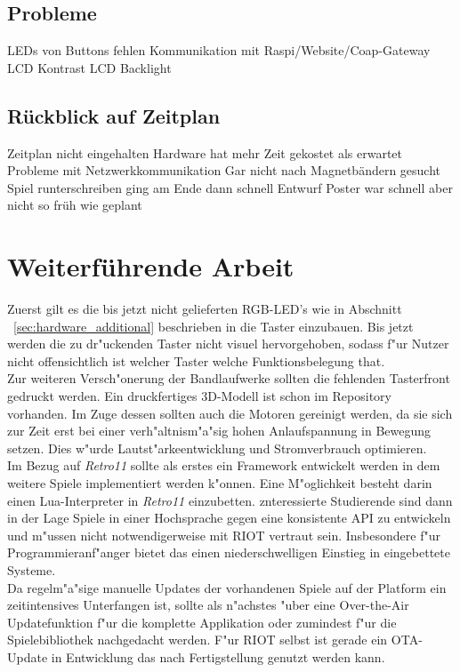 \documentclass[a4paper]{article}
\begin{document}
  \subsection{Probleme}
  LEDs von Buttons fehlen
  Kommunikation mit Raspi/Website/Coap-Gateway
  LCD Kontrast
  LCD Backlight
  \subsection{Rückblick auf Zeitplan}
  Zeitplan nicht eingehalten
  Hardware hat mehr Zeit gekostet als erwartet
  Probleme mit Netzwerkkommunikation
  Gar nicht nach Magnetbändern gesucht
  Spiel runterschreiben ging am Ende dann schnell
  Entwurf Poster war schnell aber nicht so früh wie geplant

\section{Weiterführende Arbeit}
  \label{sec:further}
  Zuerst gilt es die bis jetzt nicht gelieferten RGB-LED's wie in Abschnitt
  ~\ref{sec:hardware_additional} beschrieben in die Taster einzubauen. Bis
  jetzt werden die zu dr"uckenden Taster nicht visuel hervorgehoben, sodass
  f"ur Nutzer nicht offensichtlich ist welcher Taster welche Funktionsbelegung
  that.\\
  Zur weiteren Versch"onerung der Bandlaufwerke sollten die fehlenden
  Tasterfront gedruckt werden. Ein druckfertiges 3D-Modell ist schon im
  Repository vorhanden. Im Zuge dessen sollten auch die Motoren gereinigt
  werden, da sie sich zur Zeit erst bei einer verh"altnism"a"sig hohen
  Anlaufspannung in Bewegung setzen. Dies w"urde Lautst"arkeentwicklung und
  Stromverbrauch optimieren.\\
  Im Bezug auf \textit{Retro11} sollte als erstes ein Framework entwickelt
  werden in dem weitere Spiele implementiert werden k"onnen.
  Eine M"oglichkeit besteht darin einen Lua-Interpreter in \textit{Retro11}
  einzubetten. znteressierte Studierende sind dann in der Lage Spiele in einer
  Hochsprache gegen eine konsistente API zu entwickeln und m"ussen nicht
  notwendigerweise mit RIOT vertraut sein. Insbesondere f"ur Programmieranf"anger
  bietet das einen niederschwelligen Einstieg in eingebettete Systeme.\\
  Da regelm"a"sige manuelle Updates der vorhandenen Spiele auf der
  Platform ein zeitintensives Unterfangen ist, sollte als n"achstes "uber eine
  Over-the-Air Updatefunktion f"ur die komplette Applikation oder zumindest
  f"ur die Spielebibliothek nachgedacht werden. F"ur RIOT selbst ist gerade ein
  OTA-Update in Entwicklung das nach Fertigstellung genutzt werden kann.\\\\
\end{document}
